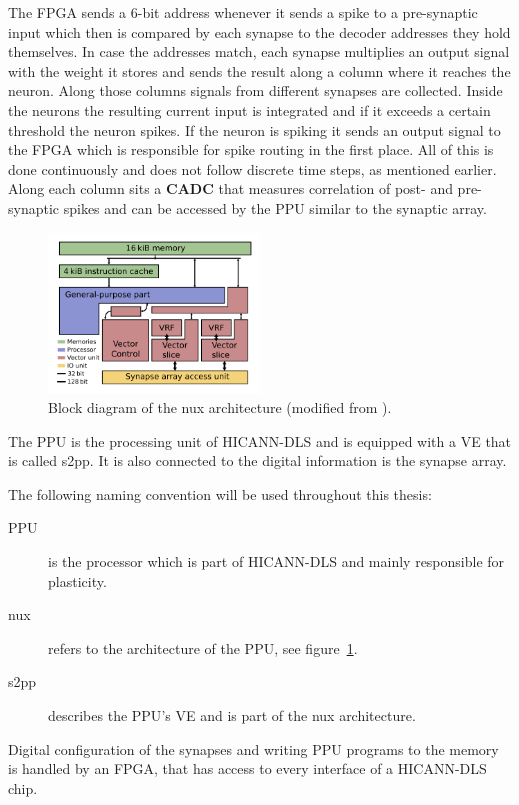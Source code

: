 The \ac{FPGA} sends a 6-bit address whenever it sends a spike to a pre-synaptic input which then is compared by each synapse to the decoder addresses they hold themselves.
In case the addresses match, each synapse multiplies an output signal with the weight it stores and sends the result along a column where it reaches the neuron.
Along those columns signals from different synapses are collected.
Inside the neurons the resulting current input is integrated and if it exceeds a certain threshold the neuron spikes.
If the neuron is spiking it sends an output signal to the FPGA which is responsible for spike routing in the first place.
All of this is done continuously and does not follow discrete time steps, as mentioned earlier.
Along each column sits a \textbf{\ac{CADC}} that measures correlation of post- and pre-synaptic spikes and can be accessed by the \ac{PPU} similar to the synaptic array.
\begin{figure}
    \centering
    \includegraphics[width=0.5\textwidth]{pictures/nux.png}
    \caption{\label{fig:nux} Block diagram of the nux architecture (modified from \citeauthor{PPU}).}
\end{figure}
The \ac{PPU} is the processing unit of \ac{HICANN-DLS} and is equipped with a \ac{VE} that is called \ac{s2pp}.
It is also connected to the digital information is the synapse array.

The following naming convention will be used throughout this thesis:
\begin{description}
    \item[\ac{PPU}] is the processor which is part of \ac{HICANN-DLS} and mainly responsible for plasticity.
    \item[nux] refers to the architecture of the \ac{PPU}, see figure~\ref{fig:nux}.
    \item[\ac{s2pp}] describes the \ac{PPU}'s \ac{VE} and is part of the nux architecture.
\end{description}

Digital configuration of the synapses and writing \ac{PPU} programs to the memory is handled by an \ac{FPGA}, that has access to every interface of a \ac{HICANN-DLS} chip.

